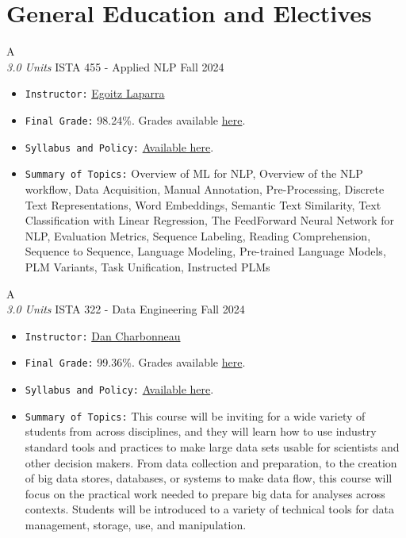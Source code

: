 \section{General Education and Electives}

\cventry
{A \\ \small{\textit{3.0 Units}}}
{ISTA 455 - Applied NLP}
{Fall 2024}
{}
{}
{
  \begin{itemize}
    \item \texttt{Instructor:} \href{https://egolaparra.github.io/}{Egoitz Laparra}
    \item \texttt{Final Grade:} 98.24\%. Grades available \href{https://mhrezaei.com/assets/cv/courses/Spring2025/ISTA455/Grades.pdf}{here}.
    \item \texttt{Syllabus and Policy:} \href{https://mhrezaei.com/assets/cv/courses/Spring2025/ISTA455/Syllabus.pdf}{Available here}.
    \item \texttt{Summary of Topics:} Overview of ML for NLP, Overview of the NLP workflow, Data Acquisition, Manual Annotation, 
    Pre-Processing, Discrete Text Representations, Word Embeddings, 
    Semantic Text Similarity, Text Classification with Linear Regression, 
    The FeedForward Neural Network for NLP, Evaluation Metrics, Sequence Labeling, 
    Reading Comprehension, Sequence to Sequence, Language Modeling, Pre-trained Language Models, 
    PLM Variants, Task Unification, Instructed PLMs
  \end{itemize}
}


\cventry
{A \\ \small{\textit{3.0 Units}}}
{ISTA 322 - Data Engineering}
{Fall 2024}
{}
{}
{
  \begin{itemize}
    \item \texttt{Instructor:} \href{https://infosci.arizona.edu/person/dan-charbonneau}{Dan Charbonneau}
    \item \texttt{Final Grade:} 99.36\%. Grades available \href{https://mhrezaei.com/assets/cv/courses/Fall2024/ISTA322/Grades.pdf}{here}.
    \item \texttt{Syllabus and Policy:} \href{https://mhrezaei.com/assets/cv/courses/Fall2024/ISTA322/Syllabus.pdf}{Available here}.
    \item \texttt{Summary of Topics:} This course will be inviting for a wide variety of students from across disciplines, and they will learn how to use industry standard tools and practices to make large data sets usable for scientists and other decision makers. From data collection and preparation, to the creation of big data stores, databases, or systems to make data flow, this course will focus on the practical work needed to prepare big data for analyses across contexts. Students will be introduced to a variety of technical tools for data management, storage, use, and manipulation.
  \end{itemize}
}


